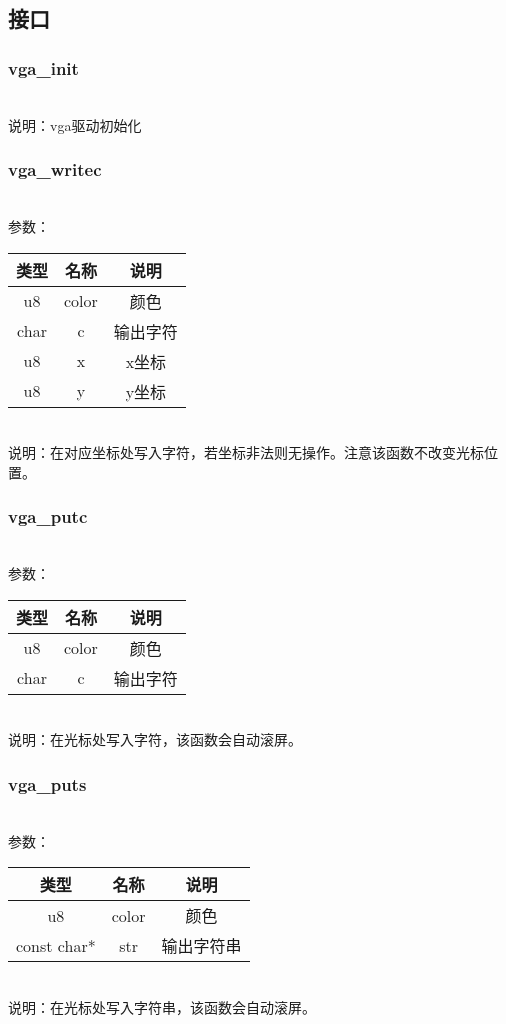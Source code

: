 \subsection{接口}

\subsubsection{vga\_init}
\\
说明：vga驱动初始化

\subsubsection{vga\_writec}
\\
参数：\\
\begin{tabular}{|c|c|c|}
    \hline
    类型 & 名称 & 说明\\\hline
    u8 & color & 颜色\\\hline
    char & c & 输出字符\\\hline
    u8 & x & x坐标\\\hline
    u8 & y & y坐标\\\hline
\end{tabular}\\
说明：在对应坐标处写入字符，若坐标非法则无操作。注意该函数不改变光标位置。

\subsubsection{vga\_putc}
\\
参数：\\
\begin{tabular}{|c|c|c|}
    \hline
    类型 & 名称 & 说明\\\hline
    u8 & color & 颜色\\\hline
    char & c & 输出字符\\\hline
\end{tabular}\\
说明：在光标处写入字符，该函数会自动滚屏。

\subsubsection{vga\_puts}
\\
参数：\\
\begin{tabular}{|c|c|c|}
    \hline
    类型 & 名称 & 说明\\\hline
    u8 & color & 颜色\\\hline
    const char* & str & 输出字符串\\\hline
\end{tabular}\\
说明：在光标处写入字符串，该函数会自动滚屏。

